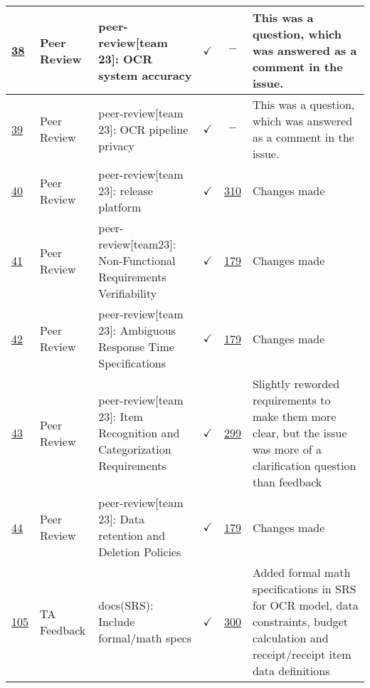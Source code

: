 \documentclass{article}
\begin{document}
\begin{table}[H]
{\begin{tabular}{p{1.5cm} p{2cm} p{3.5cm} c c p{4cm}}
        \href{https://github.com/PlutosCapstone/Plutos/issues/38}{38} & Peer
        Review & peer-review[team 23]: OCR system accuracy & $\checkmark$ & $-$
        & This was a question, which was answered as a comment in the issue.  \\ \hline
        \href{https://github.com/PlutosCapstone/Plutos/issues/39}{39} & Peer
        Review & peer-review[team 23]: OCR pipeline privacy & $\checkmark$ & $-$ &
        This was a question, which was answered as a comment in the issue.  \\ \hline
        \href{https://github.com/PlutosCapstone/Plutos/issues/40}{40} & Peer
        Review & peer-review[team 23]: release platform & $\checkmark$
        & \href{https://github.com/PlutosCapstone/Plutos/pull/x}{310} & Changes made \\ \hline
        \href{https://github.com/PlutosCapstone/Plutos/issues/41}{41} & Peer
        Review & peer-review[team23]: Non-Functional Requirements Verifiability
        & $\checkmark$ & \href{https://github.com/PlutosCapstone/Plutos/pull/179}{179} &
        Changes made  \\ \hline
        \href{https://github.com/PlutosCapstone/Plutos/issues/42}{42} & Peer
        Review & peer-review[team 23]: Ambiguous Response Time Specifications  &
        $\checkmark$ &
        \href{https://github.com/PlutosCapstone/Plutos/pull/179}{179} & Changes
        made  \\ \hline
        \href{https://github.com/PlutosCapstone/Plutos/issues/43}{43} & Peer
        Review & peer-review[team 23]: Item Recognition and Categorization
        Requirements  & $\checkmark$ &
        \href{https://github.com/PlutosCapstone/Plutos/pull/299}{299} & Slightly
        reworded requirements to make them more clear, but the issue was more of
        a clarification question than feedback \\ \hline
        \href{https://github.com/PlutosCapstone/Plutos/issues/44}{44} & Peer
        Review & peer-review[team 23]: Data retention and Deletion Policies  & $\checkmark$ &
        \href{https://github.com/PlutosCapstone/Plutos/pull/179}{179} & Changes
        made \\ \hline
        \href{https://github.com/PlutosCapstone/Plutos/issues/105}{105} & TA
        Feedback & docs(SRS): Include formal/math specs & $\checkmark$ & \href{https://github.com/PlutosCapstone/Plutos/pull/300}{300}
        &  Added formal math specifications in SRS for OCR model, data constraints, budget calculation and receipt/receipt item data definitions \\
    \bottomrule
    \end{tabular}%
    }
\end{table}
\end{document}

